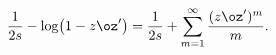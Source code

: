 \begin{equation*}
\frac{1}{2s}-\log\bigl(1-z\oz'\bigr)=\frac{1}{2s}+
\sum_{m=1}^{\infty}\frac{(z\oz')^m}{m}.
\end{equation*}

